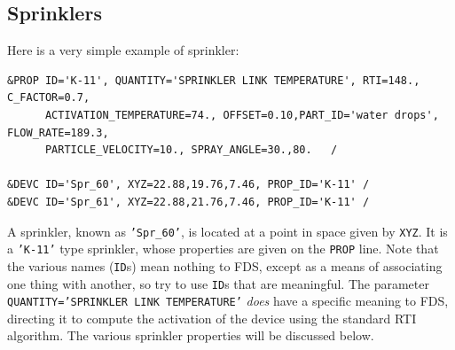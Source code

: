 \documentclass[11pt]{book}
\newcommand{\ct}{\tt\small}
\begin{document}
\subsection{Sprinklers}
\label{info:sprinklers}

Here is a very simple example of sprinkler:

\footnotesize
\begin{verbatim}
&PROP ID='K-11', QUANTITY='SPRINKLER LINK TEMPERATURE', RTI=148., C_FACTOR=0.7,
      ACTIVATION_TEMPERATURE=74., OFFSET=0.10,PART_ID='water drops', FLOW_RATE=189.3,
      PARTICLE_VELOCITY=10., SPRAY_ANGLE=30.,80.   /

&DEVC ID='Spr_60', XYZ=22.88,19.76,7.46, PROP_ID='K-11' /
&DEVC ID='Spr_61', XYZ=22.88,21.76,7.46, PROP_ID='K-11' /
\end{verbatim} \normalsize

\noindent
A sprinkler, known as {\ct 'Spr\_60'}, is located at a point in space given by {\ct XYZ}. It is a {\ct 'K-11'} type sprinkler, whose properties
are given on the {\ct PROP} line. Note that the various names ({\ct ID}s) mean nothing to FDS, except as a means of associating one thing with
another, so try to use {\ct ID}s that are meaningful.  The parameter {\ct QUANTITY='SPRINKLER LINK TEMPERATURE'} {\em does}
have a specific meaning to FDS, directing it to compute the activation of
the device using the standard RTI algorithm. The various sprinkler properties will be discussed below.
\end{document}
